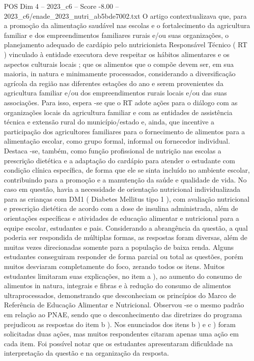\begin{textsample}{POS Dim 4 – 2023\_c6 – Score -8.00 – 2023\_c6/enade\_2023\_nutri\_ab5bde7002.txt}
O artigo contextualizava que, para a promoção da alimentação saudável nas escolas e o fortalecimento da agricultura familiar e dos empreendimentos familiares rurais e/ou suas organizações, o planejamento adequado de cardápio pelo nutricionista Responsável Técnico ( RT ) vinculado à entidade executora deve respeitar os hábitos alimentares e os aspectos culturais locais ; que os alimentos que o compõe devem ser, em sua maioria, in natura e minimamente processados, considerando a diversificação agrícola da região nas diferentes estações do ano e serem provenientes da agricultura familiar e/ou dos empreendimentos rurais locais e/ou das suas associações.
Para isso, espera -se que o RT adote ações para o diálogo com as organizações locais da agricultura familiar e com as entidades de assistência técnica e extensão rural do município/estado e, ainda, que incentive a participação dos agricultores familiares para o fornecimento de alimentos para a alimentação escolar, como grupo formal, informal ou fornecedor individual.
Destaca -se, também, como função profissional de nutrição nas escolas a prescrição dietética e a adaptação do cardápio para atender o estudante com condição clínica específica, de forma que ele se sinta incluído no ambiente escolar, contribuindo para a promoção e a manutenção da saúde e qualidade de vida.
No caso em questão, havia a necessidade de orientação nutricional individualizada para as crianças com DM1 ( Diabetes Mellitus tipo 1 ), com avaliação nutricional e prescrição dietética de acordo com a dose de insulina administrada, além de orientações específicas e atividades de educação alimentar e nutricional para a equipe escolar, estudantes e pais.
Considerando a abrangência da questão, a qual poderia ser respondida de múltiplas formas, as respostas foram diversas, além de muitas vezes direcionadas somente para a população de baixa renda.
Alguns estudantes conseguiram responder de forma parcial ou total as questões, porém muitos desviaram completamente do foco, zerando todos os itens.
Muitos estudantes limitaram suas explicações, no item a ), ao aumento do consumo de alimentos in natura, integrais e fibras e à redução do consumo de alimentos ultraprocessados, demonstrando que desconheciam os princípios do Marco de Referência de Educação Alimentar e Nutricional.
Observou -se o mesmo padrão em relação ao PNAE, sendo que o desconhecimento das diretrizes do programa prejudicou as respostas do item b ).
Nos enunciados dos itens b ) e c ) foram solicitadas duas ações, mas muitos respondentes citaram apenas uma ação em cada item.
Foi possível notar que os estudantes apresentaram dificuldade na interpretação da questão e na organização da resposta.

\end{textsample}
